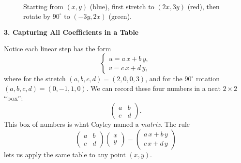 \begin{figure}[H]
    \centering
    \caption{Starting from $(x,y)$ (blue), first stretch to $(2x,3y)$ (red), then rotate by $90^\circ$ to $(-3y,2x)$ (green).}
    \end{figure}
    
    





\medskip
\noindent\textbf{3. Capturing All Coefficients in a Table}

Notice each linear step has the form
\[
\begin{cases}
u = a\,x + b\,y,\\
v = c\,x + d\,y,
\end{cases}
\]
where for the stretch \((a,b,c,d)=(2,0,0,3)\), and for the \(90^\circ\) rotation \((a,b,c,d)=(0,-1,1,0)\).  We can record these four numbers in a neat \(2\times2\) “box”:
\[
\begin{pmatrix}
a & b\\
c & d
\end{pmatrix}.
\]
This box of numbers is what Cayley named a \emph{matrix}.  The rule
\[
\begin{pmatrix}a&b\\c&d\end{pmatrix}
\begin{pmatrix}x\\y\end{pmatrix}
=
\begin{pmatrix}
a\,x + b\,y\\
c\,x + d\,y
\end{pmatrix}
\]
lets us apply the same table to any point \((x,y)\).

